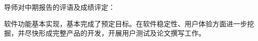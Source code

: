 \cleardoublepage{}
{
    \bfseries

    {
        \noindent 导师对中期报告的评语及成绩评定：
    }

    \setlength{\parindent}{2em}

    \par 软件功能基本实现，基本完成了预定目标。在软件稳定性、用户体验方面进一步挖掘，并尽快形成完整产品的开发，开展用户测试及论文撰写工作。

    \mbox{} \vfill
    \designmidcheckeval[9]
    \signature{指导教师（签名）}
}
